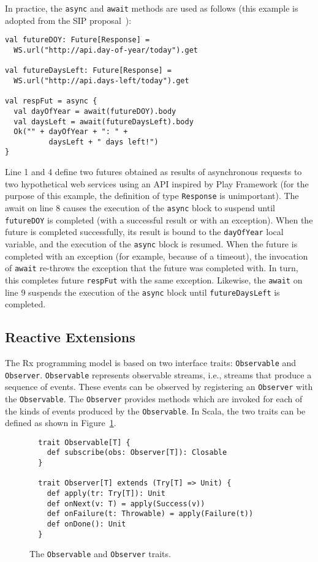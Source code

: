 \documentclass{acm_proc_article-sp}
\begin{document}
In practice, the \verb|async| and \verb|await| methods are used as follows
(this example is adopted from the SIP proposal~\cite{ScalaAsyncSIP}):

\lstset{numbers=left,xleftmargin=2em}
\begin{lstlisting}
val futureDOY: Future[Response] =
  WS.url("http://api.day-of-year/today").get

val futureDaysLeft: Future[Response] =
  WS.url("http://api.days-left/today").get

val respFut = async {
  val dayOfYear = await(futureDOY).body
  val daysLeft = await(futureDaysLeft).body
  Ok("" + dayOfYear + ": " +
          daysLeft + " days left!")
}
\end{lstlisting}

Line 1 and 4 define two futures obtained as results of asynchronous requests
to two hypothetical web services using an API inspired by Play Framework (for
the purpose of this example, the definition of type \verb|Response| is
unimportant). The await on line 8 causes the execution of the \verb|async|
block to suspend until \verb|futureDOY| is completed (with a successful result
or with an exception). When the future is completed successfully, its result
is bound to the \verb|dayOfYear| local variable, and the execution of the
\verb|async| block is resumed. When the future is completed with an exception
(for example, because of a timeout), the invocation of \verb|await| re-throws
the exception that the future was completed with. In turn, this completes
future \verb|respFut| with the same exception. Likewise, the \verb|await| on
line 9 suspends the execution of the \verb|async| block until
\verb|futureDaysLeft| is completed.


\subsection{Reactive Extensions}

The Rx programming model is based on two interface traits: \verb|Observable|
and \verb|Observer|. \verb|Observable| represents observable streams, i.e.,
streams that produce a sequence of events. These events can be observed by
registering an \verb|Observer| with the \verb|Observable|. The \verb|Observer|
provides methods which are invoked for each of the kinds of events produced by
the \verb|Observable|. In Scala, the two traits can be defined as shown in
Figure~\ref{fig:observable-observer}.

\begin{figure}[ht!]
  \centering
  \lstset{numbers=none,xleftmargin=0em}
  \begin{lstlisting}
  trait Observable[T] {
    def subscribe(obs: Observer[T]): Closable
  }

  trait Observer[T] extends (Try[T] => Unit) {
    def apply(tr: Try[T]): Unit
    def onNext(v: T) = apply(Success(v))
    def onFailure(t: Throwable) = apply(Failure(t))
    def onDone(): Unit
  }
  \end{lstlisting}
  \caption{The \texttt{Observable} and \texttt{Observer} traits.}
  \label{fig:observable-observer}
\end{figure}
\end{document}
